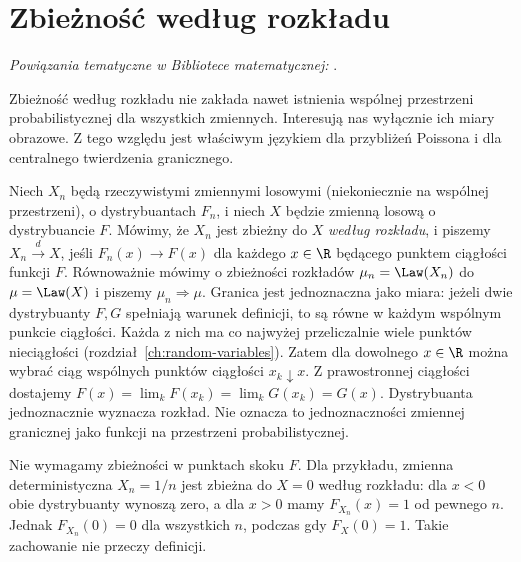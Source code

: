 \section{Zbieżność według rozkładu}

\noindent\emph{Powiązania tematyczne w Bibliotece matematycznej:} .


Zbieżność według rozkładu nie zakłada nawet istnienia
wspólnej przestrzeni probabilistycznej dla wszystkich
zmiennych. Interesują nas wyłącznie ich miary obrazowe.
Z tego względu jest właściwym językiem dla
przybliżeń Poissona i dla centralnego twierdzenia granicznego.

\begin{definicja}
Niech $X_n$ będą rzeczywistymi zmiennymi losowymi
(niekoniecznie na wspólnej przestrzeni), o dystrybuantach
$F_n$, i niech $X$ będzie zmienną losową o dystrybuancie
$F$. Mówimy, że $X_n$ jest zbieżny do $X$
\emph{według rozkładu}, i piszemy $X_n\xrightarrow{d}X$,
jeśli $F_n(x)\to F(x)$ dla każdego $x\in\R$ będącego
punktem ciągłości funkcji $F$.
Równoważnie mówimy o zbieżności rozkładów
$\mu_n=\Law(X_n)$ do $\mu=\Law(X)$ i piszemy
$\mu_n\Rightarrow\mu$.
Granica jest jednoznaczna jako miara: jeżeli dwie
dystrybuanty $F,G$ spełniają warunek definicji, to
są równe w każdym wspólnym punkcie ciągłości.
Każda z nich ma co najwyżej przeliczalnie wiele
punktów nieciągłości (rozdział~\ref{ch:random-variables}).
Zatem dla dowolnego $x\in\R$ można wybrać
ciąg wspólnych punktów ciągłości $x_k\downarrow x$.
Z prawostronnej ciągłości dostajemy
$F(x)=\lim_k F(x_k)=\lim_k G(x_k)=G(x)$.
Dystrybuanta jednoznacznie wyznacza rozkład.
Nie oznacza to jednoznaczności zmiennej granicznej
jako funkcji na przestrzeni probabilistycznej.
\end{definicja}

Nie wymagamy zbieżności w punktach skoku $F$.
Dla przykładu, zmienna deterministyczna $X_n=1/n$
jest zbieżna do $X=0$ według rozkładu:
dla $x<0$ obie dystrybuanty wynoszą zero,
a dla $x>0$ mamy $F_{X_n}(x)=1$ od pewnego $n$.
Jednak $F_{X_n}(0)=0$ dla wszystkich $n$,
podczas gdy $F_X(0)=1$.
Takie zachowanie nie przeczy definicji.

